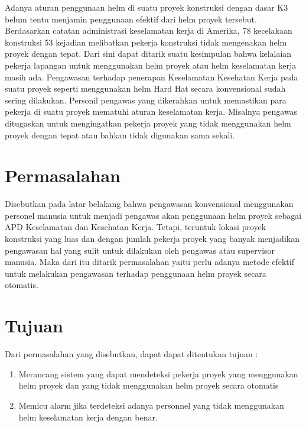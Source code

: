 Adanya aturan penggunaan helm di suatu proyek konstruksi dengan dasar K3 belum tentu menjamin penggunaan efektif dari helm proyek tersebut. Berdasarkan catatan administrasi keselamatan kerja di Amerika, 78 kecelakaan konstruksi 53 kejadian melibatkan pekerja konstruksi tidak mengenakan helm proyek dengan tepat. Dari sini dapat ditarik suatu kesimpulan bahwa kelalaian pekerja lapangan untuk menggunakan helm proyek atau helm keselamatan kerja masih ada.
Pengawasan terhadap penerapan Keselamatan Kesehatan Kerja pada suatu proyek seperti menggunakan helm Hard Hat secara konvensional sudah sering dilakukan. Personil pengawas yang dikerahkan untuk memastikan para pekerja di suatu proyek mematuhi aturan keselamatan kerja. Misalnya pengawas ditugaskan untuk mengingatkan pekerja proyek yang tidak menggunakan helm proyek dengan tepat atau bahkan tidak digunakan sama sekali.\cite{li2020deep}

\section{Permasalahan}
\label{sec:permasalahan}

Disebutkan pada latar belakang bahwa pengawasan konvensional menggunakan personel manusia untuk menjadi pengawas akan penggunaan helm proyek sebagai APD Keselamatan dan Kesehatan Kerja. Tetapi, teruntuk lokasi proyek konstruksi yang luas dan dengan jumlah pekerja proyek yang banyak menjadikan pengawasan hal yang sulit untuk dilakukan oleh pengawas atau supervisor manusia. Maka dari itu ditarik permasalahan yaitu perlu adanya metode efektif untuk melakukan pengawasan terhadap penggunaan helm proyek secara otomatis. 

\section{Tujuan}
\label{sec:Tujuan}

Dari permasalahan yang disebutkan, dapat dapat ditentukan tujuan :

\begin{enumerate}[nolistsep]

  \item Merancang sistem yang dapat mendeteksi pekerja proyek yang menggunakan helm proyek dan yang tidak menggunakan helm proyek secara otomatis
  \item Memicu alarm jika terdeteksi adanya personnel yang tidak menggunakan helm keselamatan kerja dengan benar.

\end{enumerate}

